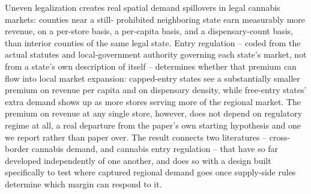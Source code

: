 \documentclass[12pt]{article}
\begin{document}
Uneven legalization creates real spatial demand spillovers in legal cannabis markets: counties near a still-
prohibited neighboring state earn measurably more revenue, on a per-store basis, a per-capita basis, and a
dispensary-count basis, than interior counties of the same legal state. Entry regulation -- coded from the
actual statutes and local-government authority governing each state's market, not from a state's own
description of itself -- determines whether that premium can flow into local market expansion: capped-entry
states see a substantially smaller premium on revenue per capita and on dispensary density, while free-entry
states' extra demand shows up as more stores serving more of the regional market. The premium on revenue at
any single store, however, does not depend on regulatory regime at all, a real departure from the paper's own
starting hypothesis and one we report rather than paper over. The result connects two literatures -- cross-
border cannabis demand, and cannabis entry regulation -- that have so far developed independently of one
another, and does so with a design built specifically to test where captured regional demand goes once
supply-side rules determine which margin can respond to it.



\end{document}

